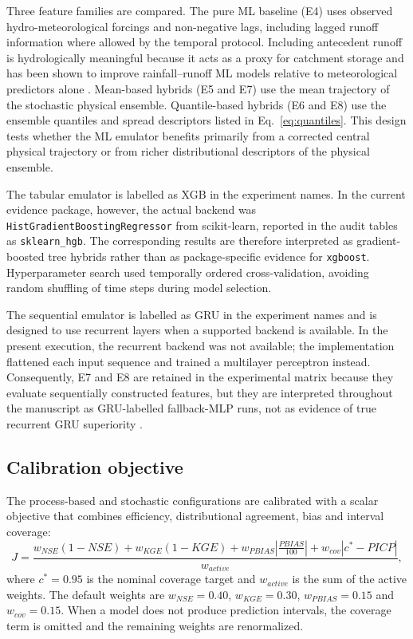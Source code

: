 \documentclass[a4paper,fleqn]{cas-sc}
\begin{document}
Three feature families are compared. The pure ML baseline (E4) uses
observed hydro-meteorological forcings and non-negative lags, including
lagged runoff information where allowed by the temporal protocol.
Including antecedent runoff is hydrologically meaningful because it
acts as a proxy for catchment storage and has been shown to improve
rainfall--runoff ML models relative to meteorological predictors alone
\citep{adnan2021comparison}. Mean-based hybrids (E5 and E7) use the
mean trajectory of the stochastic physical ensemble. Quantile-based
hybrids (E6 and E8) use the ensemble quantiles and spread descriptors
listed in Eq.~\ref{eq:quantiles}. This design tests whether the ML
emulator benefits primarily from a corrected central physical trajectory
or from richer distributional descriptors of the physical ensemble.

The tabular emulator is labelled as XGB in the experiment names. In the
current evidence package, however, the actual backend was
\texttt{HistGradientBoostingRegressor} from scikit-learn, reported in
the audit tables as \texttt{sklearn\_hgb}. The corresponding results
are therefore interpreted as gradient-boosted tree hybrids rather than
as package-specific evidence for \texttt{xgboost}. Hyperparameter search
used temporally ordered cross-validation, avoiding random shuffling of
time steps during model selection.

The sequential emulator is labelled as GRU in the experiment names and
is designed to use recurrent layers when a supported backend is
available. In the present execution, the recurrent backend was not
available; the implementation flattened each input sequence and trained
a multilayer perceptron instead. Consequently, E7 and E8 are retained in
the experimental matrix because they evaluate sequentially constructed
features, but they are interpreted throughout the manuscript as
GRU-labelled fallback-MLP runs, not as evidence of true recurrent GRU
superiority \citep{kratzert2018rainfall,kratzert2019towards}.

\subsection{Calibration objective}\label{subsec:calibration}

The process-based and stochastic configurations are calibrated with a
scalar objective that combines efficiency, distributional agreement,
bias and interval coverage:
\begin{equation}
J = \frac{w_{NSE}(1-NSE) + w_{KGE}(1-KGE)
  + w_{PBIAS}\left|\frac{PBIAS}{100}\right|
  + w_{cov}|c^*-PICP|}{w_{active}},
\label{eq:objective}
\end{equation}
where $c^*=0.95$ is the nominal coverage target and $w_{active}$ is the
sum of the active weights. The default weights are $w_{NSE}=0.40$,
$w_{KGE}=0.30$, $w_{PBIAS}=0.15$ and $w_{cov}=0.15$. When a model does
not produce prediction intervals, the coverage term is omitted and the
remaining weights are renormalized.
\end{document}
